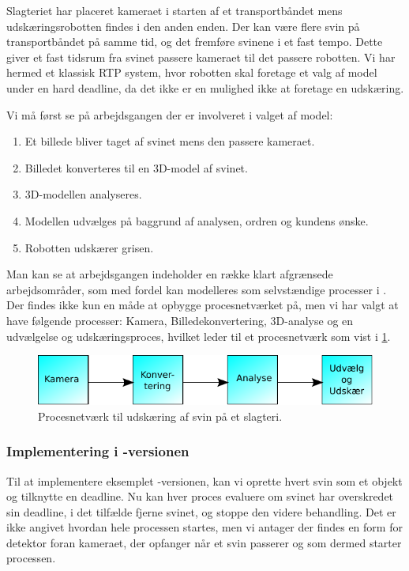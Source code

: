 Slagteriet har placeret kameraet i starten af et transportbåndet mens udskæringsrobotten findes i den anden enden. Der kan være flere svin på transportbåndet på samme tid, og det fremføre svinene i et fast tempo. Dette giver et fast tidsrum fra svinet passere kameraet til det passere robotten. Vi har hermed et klassisk RTP system, hvor robotten skal foretage et valg af model under en hard deadline, da det ikke er en mulighed ikke at foretage en udskæring.

Vi må først se på arbejdsgangen der er involveret i valget af model:
\begin{enumerate}
\tightlist
	\item Et billede bliver taget af svinet mens den passere kameraet.
	\item Billedet konverteres til en 3D-model af svinet.
	\item 3D-modellen analyseres.
	\item Modellen udvælges på baggrund af analysen, ordren og kundens ønske.
	\item Robotten udskærer grisen.
\end{enumerate}

Man kan se at arbejdsgangen indeholder en  række klart afgrænsede arbejdsområder, som med fordel kan modelleres som selvstændige processer i \pycsp. Der findes  ikke kun en måde at opbygge procesnetværket på, men vi har valgt at have følgende processer: Kamera, Billedekonvertering, 3D-analyse og en udvælgelse og udskæringsproces, hvilket leder til et procesnetværk som vist i \cref{fig:pig-network}.

\begin{figure}
 \begin{center}
  \includegraphics[scale=1]{images/pig-network}
	\caption{Procesnetværk til udskæring af svin på et slagteri.}
	\label{fig:pig-network}
\end{center}
\end{figure}

\subsubsection*{Implementering i -versionen}
Til at implementere eksemplet -versionen, kan vi oprette hvert svin som et objekt og tilknytte en deadline. Nu kan hver proces evaluere om svinet har overskredet sin deadline, i det tilfælde fjerne svinet, og stoppe den videre behandling. Det er ikke angivet hvordan hele processen startes, men vi antager der findes en form for detektor foran kameraet, der opfanger når et svin passerer og som dermed starter processen. 

